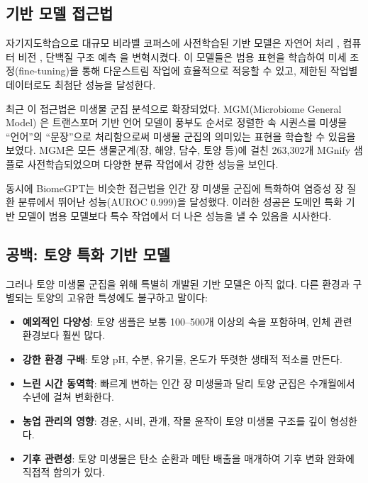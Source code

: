 \documentclass[11pt,a4paper]{article}
\begin{document}
\subsection{기반 모델 접근법}

자기지도학습으로 대규모 비라벨 코퍼스에 사전학습된 기반 모델은 자연어 처리 \citep{brown2020language}, 컴퓨터 비전 \citep{dosovitskiy2020image}, 단백질 구조 예측 \citep{jumper2021highly}을 변혁시켰다. 이 모델들은 범용 표현을 학습하여 미세 조정(fine-tuning)을 통해 다운스트림 작업에 효율적으로 적응할 수 있고, 제한된 작업별 데이터로도 최첨단 성능을 달성한다.

최근 이 접근법은 미생물 군집 분석으로 확장되었다. MGM(Microbiome General Model) \citep{mgm2024}은 트랜스포머 기반 언어 모델이 풍부도 순서로 정렬한 속 시퀀스를 미생물 ``언어''의 ``문장''으로 처리함으로써 미생물 군집의 의미있는 표현을 학습할 수 있음을 보였다. MGM은 모든 생물군계(장, 해양, 담수, 토양 등)에 걸친 263,302개 MGnify 샘플로 사전학습되었으며 다양한 분류 작업에서 강한 성능을 보인다.

동시에 BiomeGPT는 비슷한 접근법을 인간 장 미생물 군집에 특화하여 염증성 장 질환 분류에서 뛰어난 성능(AUROC 0.999)을 달성했다. 이러한 성공은 도메인 특화 기반 모델이 범용 모델보다 특수 작업에서 더 나은 성능을 낼 수 있음을 시사한다.

\subsection{공백: 토양 특화 기반 모델}

그러나 토양 미생물 군집을 위해 특별히 개발된 기반 모델은 아직 없다. 다른 환경과 구별되는 토양의 고유한 특성에도 불구하고 말이다:

\begin{itemize}[leftmargin=1.5em]
    \item \textbf{예외적인 다양성}: 토양 샘플은 보통 100--500개 이상의 속을 포함하며, 인체 관련 환경보다 훨씬 많다.
    \item \textbf{강한 환경 구배}: 토양 pH, 수분, 유기물, 온도가 뚜렷한 생태적 적소를 만든다.
    \item \textbf{느린 시간 동역학}: 빠르게 변하는 인간 장 미생물과 달리 토양 군집은 수개월에서 수년에 걸쳐 변화한다.
    \item \textbf{농업 관리의 영향}: 경운, 시비, 관개, 작물 윤작이 토양 미생물 구조를 깊이 형성한다.
    \item \textbf{기후 관련성}: 토양 미생물은 탄소 순환과 메탄 배출을 매개하여 기후 변화 완화에 직접적 함의가 있다.
\end{itemize}
\end{document}
